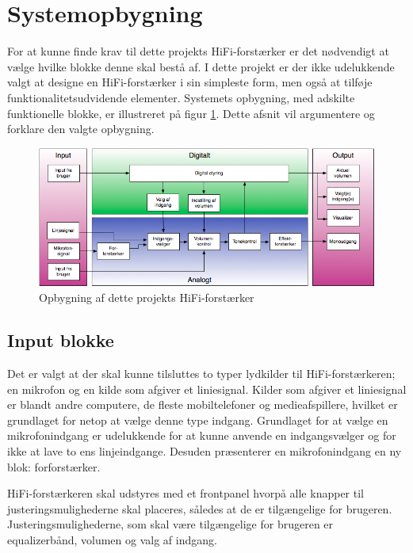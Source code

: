 \section{Systemopbygning}
For at kunne finde krav til dette projekts HiFi-forstærker er det nødvendigt at vælge hvilke blokke denne skal bestå af. I dette projekt er der ikke udelukkende valgt at designe en HiFi-forstærker i sin simpleste form, men også at tilføje funktionalitetsudvidende elementer. Systemets opbygning, med adskilte funktionelle blokke, er illustreret på figur \ref{fig:hififorstaerker_opbygning}. Dette afsnit vil argumentere og forklare den valgte opbygning. 


\begin{figure}[h]
\centering
\includegraphics[scale=0.6]{indledende_analyse/systemopbygning/forstaerker_opbygning.png}
\caption{Opbygning af dette projekts HiFi-forstærker}
\label{fig:hififorstaerker_opbygning}
\end{figure}


\subsection*{Input blokke}
Det er valgt at der skal kunne tilsluttes to typer lydkilder til HiFi-forstærkeren; en mikrofon og en kilde som afgiver et liniesignal. Kilder som afgiver et liniesignal er blandt andre computere, de fleste mobiltelefoner og medieafspillere, hvilket er grundlaget for netop at vælge denne type indgang. 
Grundlaget for at vælge en mikrofonindgang er udelukkende for at kunne anvende en indgangsvælger og for ikke at lave to ens linjeindgange. Desuden præsenterer en mikrofonindgang en ny blok: forforstærker.

HiFi-forstærkeren skal udstyres med et frontpanel hvorpå alle knapper til justeringsmulighederne skal placeres, således at de er tilgængelige for brugeren. Justeringsmulighederne, som skal være tilgængelige for brugeren er equalizerbånd, volumen og valg af indgang.

